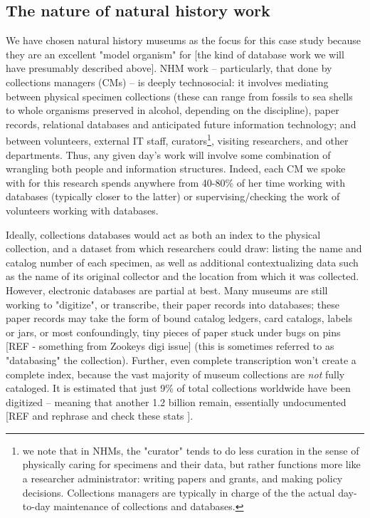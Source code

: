 \subsection{The nature of natural history work}

We have chosen natural history museums as the focus for this case study because they are an excellent "model organism" for [the kind of database work we will have presumably described above]. NHM work -- particularly, that done by collections managers (CMs) -- is deeply technosocial: it involves mediating between physical specimen collections (these can range from fossils to sea shells to whole organisms preserved in alcohol, depending on the discipline), paper records, relational databases and anticipated future information technology; and between volunteers, external IT staff, curators\footnote{we note that in NHMs, the "curator" tends to do less curation in the sense of physically caring for specimens and their data, but rather functions more like a researcher administrator: writing papers and grants, and making policy decisions. Collections managers are typically in charge of the the actual day-to-day maintenance of collections and databases.}, visiting researchers, and other departments. Thus, any given day’s work will involve some combination of wrangling both people and information structures. Indeed, each CM we spoke with for this research spends anywhere from 40-80\% of her time working with databases (typically closer to the latter) or supervising/checking the work of volunteers working with databases.

Ideally, collections databases would act as both an index to the physical collection, and a dataset from which researchers could draw: listing the name and catalog number of each specimen, as well as additional contextualizing data such as the name of its original collector and the location from which it was collected. However, electronic databases are partial at best. Many museums are still working to "digitize", or transcribe, their paper records into databases; these paper records may take the form of bound catalog ledgers, card catalogs, labels or jars, or most confoundingly, tiny pieces of paper stuck under bugs on pins [REF - something from Zookeys digi issue] (this is sometimes referred to as "databasing" the collection). Further, even complete transcription won't create a complete index, because the vast majority of museum collections are \textit{not} fully cataloged. It is estimated that just 9\% of total collections worldwide have been digitized -- meaning that another 1.2 billion remain, essentially undocumented [REF and rephrase and check these stats \cite{Ari_o_2010}].

